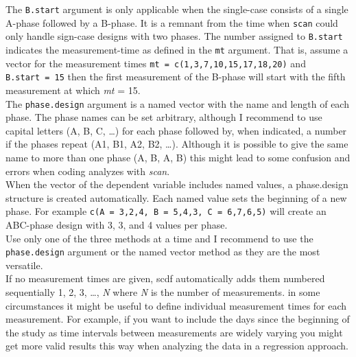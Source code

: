 \documentclass[
]{book}
\begin{document}
The \texttt{B.start} argument is only applicable when the single-case consists of a single A-phase followed by a B-phase. It is a remnant from the time when \texttt{scan} could only handle sign-case designs with two phases. The number assigned to \texttt{B.start} indicates the measurement-time as defined in the \texttt{mt} argument. That is, assume a vector for the measurement times \texttt{mt\ =\ c(1,3,7,10,15,17,18,20)} and \texttt{B.start\ =\ 15} then the first measurement of the B-phase will start with the fifth measurement at which \emph{mt} = 15.\\
The \texttt{phase.design} argument is a named vector with the name and length of each phase. The phase names can be set arbitrary, although I recommend to use capital letters (A, B, C, \ldots) for each phase followed by, when indicated, a number if the phases repeat (A1, B1, A2, B2, \ldots). Although it is possible to give the same name to more than one phase (A, B, A, B) this might lead to some confusion and errors when coding analyzes with \emph{scan}.\\
When the vector of the dependent variable includes named values, a phase.design structure is created automatically. Each named value sets the beginning of a new phase. For example \texttt{c(A\ =\ 3,2,4,\ B\ =\ 5,4,3,\ C\ =\ 6,7,6,5)} will create an ABC-phase design with 3, 3, and 4 values per phase.\\
Use only one of the three methods at a time and I recommend to use the \texttt{phase.design} argument or the named vector method as they are the most versatile.\\
If no measurement times are given, scdf automatically adds them numbered sequentially 1, 2, 3, \ldots, \emph{N} where \emph{N} is the number of measurements. in some circumstances it might be useful to define individual measurement times for each measurement. For example, if you want to include the days since the beginning of the study as time intervals between measurements are widely varying you might get more valid results this way when analyzing the data in a regression approach.
\end{document}
